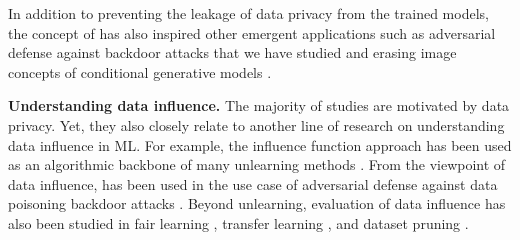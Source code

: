In addition to   preventing the leakage of  data privacy  from the trained models, the concept of {\MU} has also inspired  other emergent applications such as adversarial defense against backdoor attacks \cite{liu2022backdoor,warnecke2021machine} that we have studied and erasing image concepts of conditional generative models \cite{gandikota2023erasing,zhang2023forget}.

 


\noindent \textbf{Understanding data influence.}
The majority of {\MU} studies are motivated by data privacy. Yet, they  also closely relate to another line of research on understanding data influence in ML. For example, the influence function approach \cite{koh2017understanding} has been used as an algorithmic backbone of many unlearning methods  \cite{warnecke2021machine,izzo2021approximate}. From the viewpoint of data influence, {\MU}  has been used in the use case of adversarial defense against data poisoning backdoor attacks \cite{liu2022backdoor}. Beyond unlearning, evaluation of data influence  has also been studied in  fair learning  \cite{sattigeri2022fair,wang2022understanding},  transfer learning  \cite{jain2022data}, and   dataset pruning \cite{borsos2020coresets,yang2022dataset}. 





